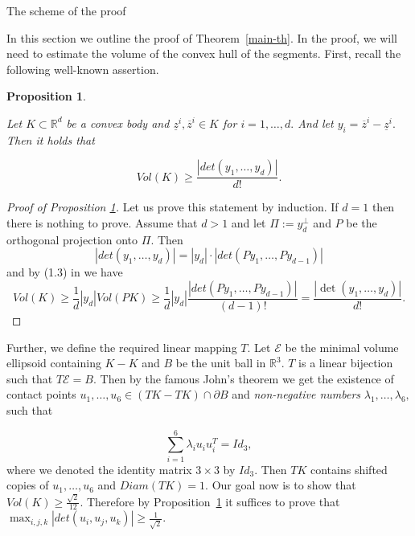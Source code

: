 \documentclass[12pt]{article}
\newtheorem{proposition}{Proposition}[section]
\begin{document}
\begin{section}{The scheme of the proof}

  In this section we outline the proof of Theorem~\ref{main-th}. In the proof, we will need to estimate the volume of the convex hull of the segments. First, recall the following well-known assertion.

\begin{proposition} 
    \label{app}
    
    Let $K\subset \mathbb{R}^{d}$ be a convex body and $\underline{z}^{i},\overline{z}^{i}\in K$ for $i =1,\ldots,d.$ And let $y_{i} = \overline{z}^{i}-\underline{z}^{i}.$ Then it holds that

    $$
        Vol(K)\geq \frac{|det(y_{1},\ldots,y_{d})|}{d!}.
    $$
        
    \end{proposition}

    \begin{proof}[Proof of Proposition \ref{app}]
        Let us prove this statement by induction. If $d=1$ then there is nothing to prove. Assume that $d>1$ and let $\Pi := y_{d}^{\perp}$ and $P$ be the orthogonal projection onto $\Pi$. Then $$|det(y_{1},\ldots,y_{d})| = |y_{d}|\cdot|det(Py_{1},\ldots,Py_{d-1})|$$ and by (1.3) in \cite{zhang} we have 
        $$
            Vol(K)\geq \frac{1}{d}|y_{d}|Vol(PK) \geq \frac{1}{d}|y_{d}|\frac{|det(Py_{1},\ldots,Py_{d-1})|}{(d-1)!} = \frac{|\det(y_{1},\ldots,y_{d})|}{d!}.
        $$
    
    \end{proof}

        Further, we define the required linear mapping $T$. Let $\mathcal{E}$ be the minimal volume ellipsoid containing $K-K$  and $B$ be the unit ball in $\mathbb{R}^{3}.$ $T$ is a linear bijection such that $T\mathcal{E} = B.$ Then by the famous John's theorem \cite {ball} we get the existence of contact points $u_{1},\ldots,u_{6}\in (TK-TK)\cap \partial B$ and \textit{non-negative numbers} $\lambda_{1},\ldots,\lambda_{6}, $ such that 

         $$
            \sum_{i=1}^{6}\lambda_{i}u_{i}u_{i}^{T} = Id_{3},
        $$
        where we denoted the identity matrix $3\times 3$ by $Id_{3}$. Then $TK$ contains shifted copies of $u_{1},\ldots,u_{6}$ and $Diam(TK)=1$. Our goal now is to show that $Vol(K)\geq \frac{\sqrt{2}}{12}$. Therefore by Proposition~\ref{app} it suffices to prove that $\max_{i,j,k}|det(u_{i},u_{j},u_{k})|\geq \frac{1}{\sqrt{2}}.$ 


\end{section}
\end{document}
